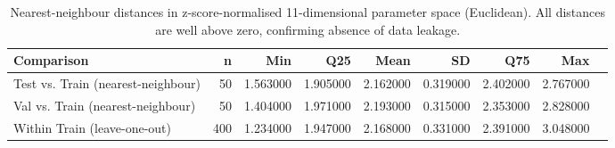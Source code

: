 \begin{table}
\caption{Nearest-neighbour distances in z-score-normalised 11-dimensional parameter space (Euclidean). All distances are well above zero, confirming absence of data leakage.}
\label{tab:lhs_distances}
\begin{tabular}{lrrrrrrrr}
\toprule
Comparison & n & Min & Q25 & Mean & SD & Q75 & Max \\
\midrule
Test vs. Train (nearest-neighbour) & 50 & 1.563000 & 1.905000 & 2.162000 & 0.319000 & 2.402000 & 2.767000 \\
Val vs. Train (nearest-neighbour) & 50 & 1.404000 & 1.971000 & 2.193000 & 0.315000 & 2.353000 & 2.828000 \\
Within Train (leave-one-out) & 400 & 1.234000 & 1.947000 & 2.168000 & 0.331000 & 2.391000 & 3.048000 \\
\bottomrule
\end{tabular}
\end{table}
